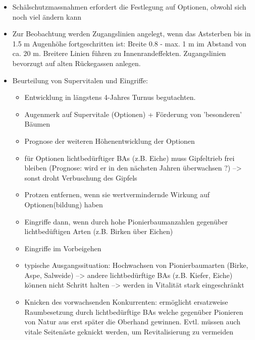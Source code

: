 \documentclass{article}
\begin{document}
\begin{itemize}
 \item Schälschutzmassnahmen erfordert die Festlegung auf Optionen, obwohl sich noch viel ändern kann 
 
 \item Zur Beobachtung werden Zugangslinien angelegt, wenn das Aststerben bis in 1.5 m Augenhöhe fortgeschritten ist: Breite 0.8 - max. 1 m im Abstand von ca. 20 m. Breitere Linien führen zu Innenrandeffekten. Zugangslinien bevorzugt auf alten Rückegassen anlegen.
 
 \item Beurteilung von Supervitalen und Eingriffe:
   \begin{itemize}
 
     \item Entwicklung in längstens 4-Jahres Turnus begutachten.
     
     \item Augenmerk auf Supervitale (Optionen) + Förderung von 'besonderen' Bäumen
     
     \item Prognose der weiteren Höhenentwicklung der Optionen
     
     \item für Optionen lichtbedürftiger BAs (z.B. Eiche) muss Gipfeltrieb frei bleiben (Prognose: wird er in den nächsten Jahren überwachsen ?) --> sonst droht Verbuschung des Gipfels
     
     \item Protzen entfernen, wenn sie wertvermindernde Wirkung auf Optionen(bildung) haben
     
     \item Eingriffe dann, wenn durch hohe Pionierbaumanzahlen gegenüber lichtbedüftigen Arten (z.B. Birken über Eichen)
     
     \item Eingriffe im Vorbeigehen
     
     \item typische Ausgangssituation: Hochwachsen von Pionierbaumarten (Birke, Aspe, Salweide) --> andere lichtbedürftige BAs (z.B. Kiefer, Eiche) können nicht Schritt halten --> werden in Vitalität stark eingeschränkt
    
     \item Knicken des vorwachsenden Konkurrenten: ermöglicht ersatzweise Raumbesetzung durch lichtbedürftige BAs welche gegenüber Pionieren von Natur aus erst später die Oberhand gewinnen. Evtl. müssen auch vitale Seitenäste geknickt werden, um Revitalisierung zu vermeiden
     

\end{itemize}
\end{itemize}
\end{document}
